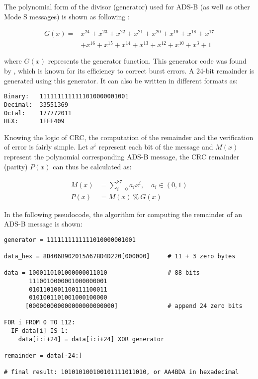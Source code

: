 The polynomial form of the divisor (generator) used for ADS-B (as well as other Mode S messages) is shown as following \cite{gertz1984}:

\begin{equation}
  \begin{split}
  G(x) = &x^{24}+x^{23}+x^{22}+x^{21}+x^{20}+x^{19}+x^{18}+x^{17} \\
         &+x^{16}+x^{15}+x^{14}+x^{13}+x^{12}+x^{10}+x^{3}+1
  \end{split}
\end{equation}

where $G(x)$ represents the generator function. This generator code was found by \cite{kasami1964}, which is known for its efficiency to correct burst errors. A 24-bit remainder is generated using this generator. It can also be written in different formats as:

\begin{verbatim}
Binary:   1111111111111010000001001
Decimal:  33551369
Octal:    177772011
HEX:      1FFF409
\end{verbatim}

Knowing the logic of CRC, the computation of the remainder and the verification of error is fairly simple. Let  $x^{i}$ represent each bit of the message and $M(x)$ represent the polynomial corresponding ADS-B message, the CRC remainder (parity) $P(x)$ can thus be calculated as:

\begin{equation}
  \begin{split}
    M(x) &= \sum_{i=0}^{87} a_i x^i , \quad a_i \in (0, 1)\\
    P(x) &= M(x) ~ \% ~ G(x)
  \end{split}
\end{equation}

In the following pseudocode, the algorithm for computing the remainder of an ADS-B message is shown:

\begin{verbatim}
generator = 1111111111111010000001001

data_hex = 8D406B902015A678D4D220[000000]     # 11 + 3 zero bytes

data = 1000110101000000011010                 # 88 bits
       1110010000001000000001
       0101101001100111100011
       0101001101001000100000
      [000000000000000000000000]              # append 24 zero bits

FOR i FROM 0 TO 112:
  IF data[i] IS 1:
    data[i:i+24] = data[i:i+24] XOR generator

remainder = data[-24:]

# final result: 101010100100101111011010, or AA4BDA in hexadecimal
\end{verbatim}

